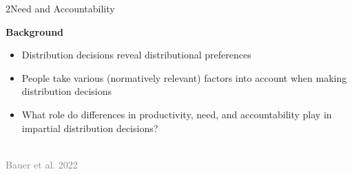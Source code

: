 \documentclass[xcolor=table,9pt,aspectratio=169]{beamer}
\begin{document}
\begin{frame}{\vspace*{10mm}2\hspace*{1em}Need and Accountability}
\begin{multicols}{2}
   \textbf{Background}\\
   \medskip
   \begin{itemize}
      \item Distribution decisions reveal distributional preferences
      \item People take various (normatively relevant) factors into account when making distribution decisions
      \item What role do differences in productivity, need, and accountability play in impartial distribution decisions?
   \end{itemize}
   \vfill
   \begin{center}
      \\
      \textcolor{gray}{Bauer et al. 2022}
   \end{center}
\end{multicols}
\end{frame}
\end{document}
